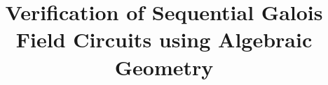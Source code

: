 \documentclass{acm_proc_article-sp}
\begin{document}
\title{Verification of Sequential Galois Field Circuits using Algebraic Geometry
}
%
%
%
%
%
\end{document}

